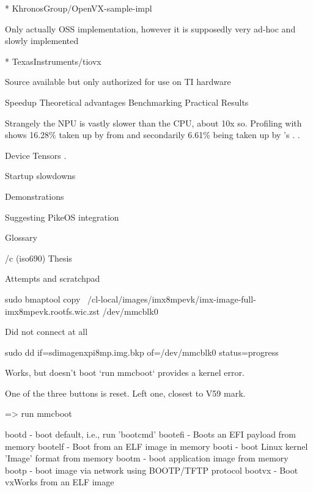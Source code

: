 * KhronosGroup/OpenVX-sample-impl

Only actually OSS implementation, however it is supposedly very ad-hoc and slowly implemented

* TexasInstruments/tiovx

Source available but only authorized for use on TI hardware
\enditems


\chap Speedup
\sec Theoretical advantages
\sec Benchmarking Practical Results

Strangely the NPU is vastly slower
than the CPU,
about 10x so.
Profiling with 
shows 16.28\% taken up by  from 
and secondarily 6.61\% being taken up by 's .
.

\sec Device Tensors
.

\sec Startup slowdowns

\chap Demonstrations

\chap Suggesting PikeOS integration

\app Glossary

\makeglos

\bibchap
\usebib/c (iso690) Thesis

\app Attempts and scratchpad

\sec sudo bmaptool copy ~/cl-local/images/imx8mpevk/imx-image-full-imx8mpevk.rootfs.wic.zst /dev/mmcblk0

Did not connect at all

\sec sudo dd if=sdimagenxpi8mp.img.bkp of=/dev/mmcblk0 status=progress

Works, but doesn't boot `run mmcboot` provides a kernel error.

One of the three buttons is reset.
Left one, closest to V59 mark.

=> run mmcboot


bootd     - boot default, i.e., run 'bootcmd'
bootefi   - Boots an EFI payload from memory
bootelf   - Boot from an ELF image in memory
booti     - boot Linux kernel 'Image' format from memory
bootm     - boot application image from memory
bootp     - boot image via network using BOOTP/TFTP protocol
bootvx    - Boot vxWorks from an ELF image

